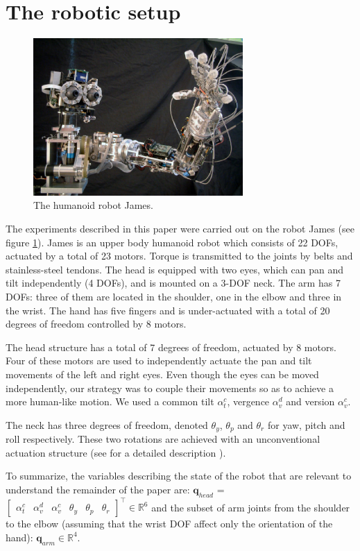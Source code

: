 \section{The robotic setup}
\label{Sec:setup}

\begin{figure}
\centering
\includegraphics[width=80mm]{Figure/James1.eps}
\caption{The humanoid robot James.}
\label{Fig:PicureJames}
\end{figure}

The experiments described in this paper were carried out on the robot 
James (see figure \ref{Fig:PicureJames}). James is an upper body 
humanoid robot which consists of 22 DOFs, actuated by a total of 
23 motors. Torque is transmitted to the joints by belts and 
stainless-steel tendons. The head is equipped with two eyes, which 
can pan and tilt independently (4 DOFs), and is mounted on a 3-DOF 
neck. The arm has 7 DOFs: three of them are located in the shoulder, 
one in the elbow and three in the wrist. The hand has five fingers 
and is under-actuated with a total of 20 degrees of freedom controlled 
by 8 motors. 

The head structure has a total of 7 degrees of freedom, actuated by 8 
motors. Four of these motors are used to independently actuate the pan 
and tilt movements of the left and right eyes. Even though the eyes 
can be moved independently, our strategy was to couple their movements 
so as to achieve a more human-like motion. We used a common tilt 
$\alpha_t^c$, vergence $\alpha_v^d$ and version $\alpha_v^c$. 

The neck has three degrees of freedom, denoted $\theta_y$, 
$\theta_p$ and $\theta_r$ for yaw, pitch and roll respectively. These 
two rotations are achieved with an unconventional actuation structure 
(see for a detailed description \cite{jamone06james}). 

To summarize, the variables describing the state of the robot that 
are relevant to understand the remainder of the paper are: $\mathbf q_{head}$ = $\begin{bmatrix} \alpha_t^c & \alpha_v^d & \alpha_v^c & \theta_y & \theta_p & \theta_r \end{bmatrix}^\top \in \mathbb R^6$
and the subset of arm joints from the shoulder to the elbow (assuming
that the wrist DOF affect only the orientation of the hand): $\mathbf q_{arm} \in \mathbb R^4$.



